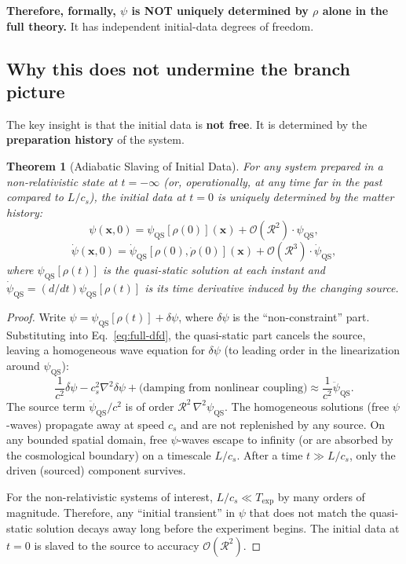 \documentclass[12pt,a4paper]{article}
\newtheorem{theorem}{Theorem}[section]
\newcommand{\order}[1]{\mathcal{O}(#1)}
\begin{document}
\textbf{Therefore, formally, $\psi$ is NOT uniquely determined by
$\rho$ alone in the full theory.} It has independent initial-data
degrees of freedom.

\subsection{Why this does not undermine the branch picture}

The key insight is that the initial data is \textbf{not free}. It is
determined by the \textbf{preparation history} of the system.

\begin{theorem}[Adiabatic Slaving of Initial Data]
\label{thm:adiabatic-slaving}
For any system prepared in a non-relativistic state at $t = -\infty$
(or, operationally, at any time far in the past compared to $L/c_s$),
the initial data at $t = 0$ is uniquely determined by the matter
history:
\begin{equation}
\psi(\mathbf{x},0) = \psi_\mathrm{QS}[\rho(0)](\mathbf{x})
+ \order{\mathcal{R}^2} \cdot \psi_\mathrm{QS},
\end{equation}
\begin{equation}
\dot\psi(\mathbf{x},0) = \dot\psi_\mathrm{QS}[\rho(0), \dot\rho(0)](\mathbf{x})
+ \order{\mathcal{R}^3} \cdot \dot\psi_\mathrm{QS},
\end{equation}
where $\psi_\mathrm{QS}[\rho(t)]$ is the quasi-static solution at each
instant and $\dot\psi_\mathrm{QS} = (d/dt)\psi_\mathrm{QS}[\rho(t)]$ is
its time derivative induced by the changing source.
\end{theorem}

\begin{proof}
Write $\psi = \psi_\mathrm{QS}[\rho(t)] + \delta\psi$, where
$\delta\psi$ is the ``non-constraint'' part. Substituting into
Eq.~\eqref{eq:full-dfd}, the quasi-static part cancels the source,
leaving a homogeneous wave equation for $\delta\psi$ (to leading order
in the linearization around $\psi_\mathrm{QS}$):
\begin{equation}\label{eq:homog}
\frac{1}{c^2}\ddot{\delta\psi}
- c_s^2\nabla^2\delta\psi
+ \text{(damping from nonlinear coupling)}
\approx \frac{1}{c^2}\ddot\psi_\mathrm{QS}.
\end{equation}
The source term $\ddot\psi_\mathrm{QS}/c^2$ is of order
$\mathcal{R}^2\,\nabla^2\psi_\mathrm{QS}$. The homogeneous solutions
(free $\psi$-waves) propagate away at speed $c_s$ and are not replenished
by any source. On any bounded spatial domain, free $\psi$-waves escape
to infinity (or are absorbed by the cosmological boundary) on a timescale
$L/c_s$. After a time $t \gg L/c_s$, only the driven (sourced) component
survives.

For the non-relativistic systems of interest, $L/c_s \ll T_\mathrm{exp}$
by many orders of magnitude. Therefore, any ``initial transient'' in
$\psi$ that does not match the quasi-static solution decays away long
before the experiment begins. The initial data at $t = 0$ is slaved to
the source to accuracy $\order{\mathcal{R}^2}$.
\end{proof}
\end{document}
